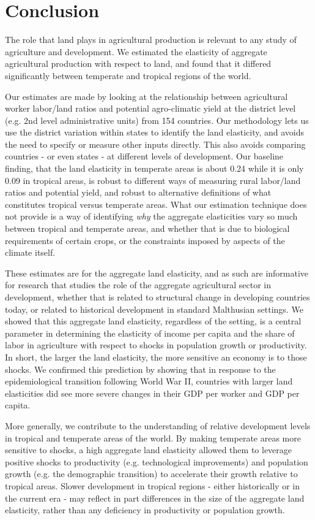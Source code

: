 \documentclass[11pt]{article}
\begin{document}
\section{Conclusion}
The role that land plays in agricultural production is relevant to any study of agriculture and development. We estimated the elasticity of aggregate agricultural production with respect to land, and found that it differed significantly between temperate and tropical regions of the world.

Our estimates are made by looking at the relationship between agricultural worker labor/land ratios and potential agro-climatic yield at the district level (e.g. 2nd level administrative units) from 154 countries. Our methodology lets us use the district variation within states to identify the land elasticity, and avoids the need to specify or measure other inputs directly. This also avoids comparing countries - or even states - at different levels of development. Our baseline finding, that the land elasticity in temperate areas is about 0.24 while it is only 0.09 in tropical areas, is robust to different ways of measuring rural labor/land ratios and potential yield, and robust to alternative definitions of what constitutes tropical versus temperate areas. What our estimation technique does not provide is a way of identifying \textit{why} the aggregate elasticities vary so much between tropical and temperate areas, and whether that is due to biological requirements of certain crops, or the constraints imposed by aspects of the climate itself.

These estimates are for the aggregate land elasticity, and as such are informative for research that studies the role of the aggregate agricultural sector in development, whether that is related to structural change in developing countries today, or related to historical development in standard Malthusian settings. We showed that this aggregate land elasticity, regardless of the setting, is a central parameter in determining the elasticity of income per capita and the share of labor in agriculture with respect to shocks in population growth or productivity. In short, the larger the land elasticity, the more sensitive an economy is to those shocks. We confirmed this prediction by showing that in response to the epidemiological transition following World War II, countries with larger land elasticities did see more severe changes in their GDP per worker and GDP per capita.

More generally, we contribute to the understanding of relative development levels in tropical and temperate areas of the world. By making temperate areas more sensitive to shocks, a high aggregate land elasticity allowed them to leverage positive shocks to productivity (e.g. technological improvements) and population growth (e.g. the demographic transition) to accelerate their growth relative to tropical areas. Slower development in tropical regions - either historically or in the current era - may reflect in part differences in the size of the aggregate land elasticity, rather than any deficiency in productivity or population growth. 
\end{document}
